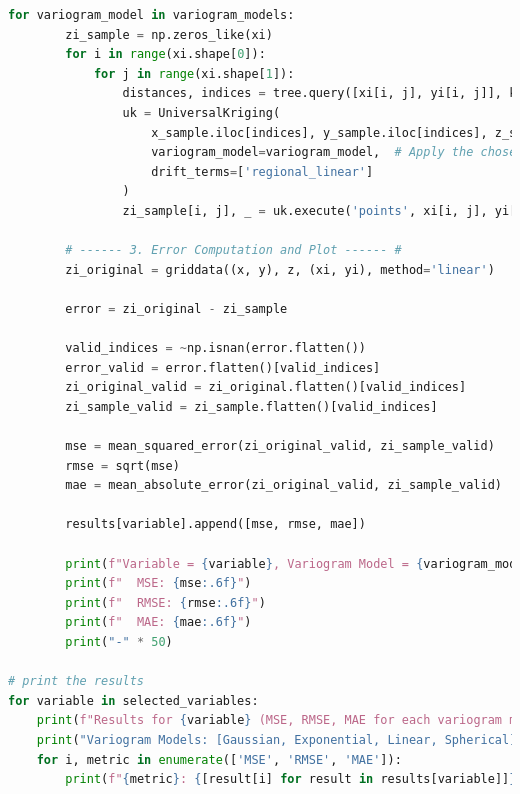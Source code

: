 \documentclass{swmcmthesis}
\begin{document}
\begin{lstlisting}[language=python,caption={The python programme for Problem 3 - Co-Kriging}]
    for variogram_model in variogram_models:
        zi_sample = np.zeros_like(xi)
        for i in range(xi.shape[0]):
            for j in range(xi.shape[1]):
                distances, indices = tree.query([xi[i, j], yi[i, j]], k=n_closest)
                uk = UniversalKriging(
                    x_sample.iloc[indices], y_sample.iloc[indices], z_sample.iloc[indices],
                    variogram_model=variogram_model,  # Apply the chosen variogram model
                    drift_terms=['regional_linear']
                )
                zi_sample[i, j], _ = uk.execute('points', xi[i, j], yi[i, j])

        # ------ 3. Error Computation and Plot ------ #
        zi_original = griddata((x, y), z, (xi, yi), method='linear')

        error = zi_original - zi_sample

        valid_indices = ~np.isnan(error.flatten()) 
        error_valid = error.flatten()[valid_indices]
        zi_original_valid = zi_original.flatten()[valid_indices]
        zi_sample_valid = zi_sample.flatten()[valid_indices]

        mse = mean_squared_error(zi_original_valid, zi_sample_valid)
        rmse = sqrt(mse)
        mae = mean_absolute_error(zi_original_valid, zi_sample_valid)

        results[variable].append([mse, rmse, mae])

        print(f"Variable = {variable}, Variogram Model = {variogram_model}:")
        print(f"  MSE: {mse:.6f}")
        print(f"  RMSE: {rmse:.6f}")
        print(f"  MAE: {mae:.6f}")
        print("-" * 50)

# print the results
for variable in selected_variables:
    print(f"Results for {variable} (MSE, RMSE, MAE for each variogram model):")
    print("Variogram Models: [Gaussian, Exponential, Linear, Spherical]")
    for i, metric in enumerate(['MSE', 'RMSE', 'MAE']):
        print(f"{metric}: {[result[i] for result in results[variable]]}")
\end{lstlisting}
\end{document}
